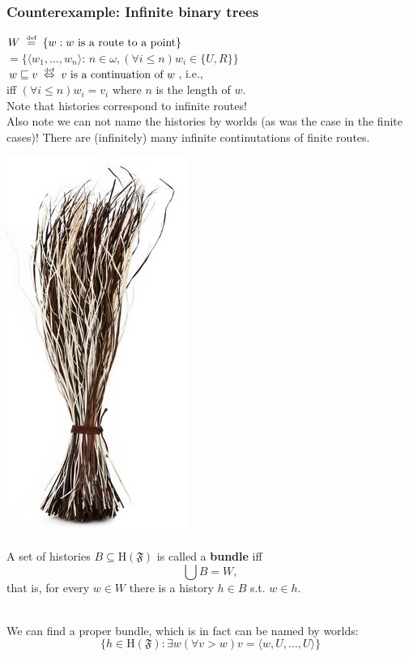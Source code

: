 \documentclass[xcolor=x11names]{beamer}
\newcommand{\defegy}[1][.1]{\hspace{#1cm}\overset{\textup{\tiny def}}{=}\hspace{#1cm}}
\newcommand{\defekv}[1][.1]{\hspace{#1cm}\overset{\textup{\tiny def}}{ \Leftrightarrow }\hspace{#1cm}}
\newcommand{\forallp}[1]{(\forall #1)}
\begin{document}
\begin{frame}[t]
	\frametitle{Counterexample: Infinite binary trees}

\scriptsize
\begin{minipage}{.55\textwidth}
    $W \defegy \{ w : w \textup{ is a route to a point}\}$
\\  $= \{ \langle w_1, \dots , w_n \rangle {:}\, n{\in} \omega, \forallp {i{\leq} n} w_i{\in} \{U,R\}\} $
\\[1em]  $w \sqsubseteq v \defekv \textup{$v$ is a continuation of $w$}$, i.e.,
\\       iff $\forallp {i\leq n} w_i= v_i $ where $n$ is the length of $w$.
\\[1em] Note that histories correspond to infinite routes!
\\[1em] Also note we can not name the histories by worlds (as was the case in the finite cases)! There are (infinitely) many infinite continutations of finite routes.
\\
\begin{minipage}{1.2cm}
\includegraphics[scale=.15]{kepek/bundle.jpeg}
\end{minipage}
\begin{minipage}{4.5cm}
A set of histories $B\subseteq \mathrm{H}(\mathfrak F)$ is called a \textbf{bundle} iff \[ \bigcup B = W, \]
that is, for every $w\in W$ there is a history $h\in B$ s.t. $w\in h$.
\end{minipage}
\\ We can find a proper bundle, which is in fact can be named by worlds:
\[ \{ h\in \mathrm H(\mathfrak F) : \exists w \forallp {v>w} v=\langle w,U,\dots, U\rangle  \}\]
\end{minipage}
\begin{minipage}{.2\textwidth}\begin{tikzpicture}[>=stealth, scale=.6,
world/.style={inner sep=.4mm, fill=black, circle},
intension/.style={fill=black, fill opacity=.1},
altrel/.style={->}]



\end{tikzpicture}
\end{minipage}
\end{frame}
\end{document}
